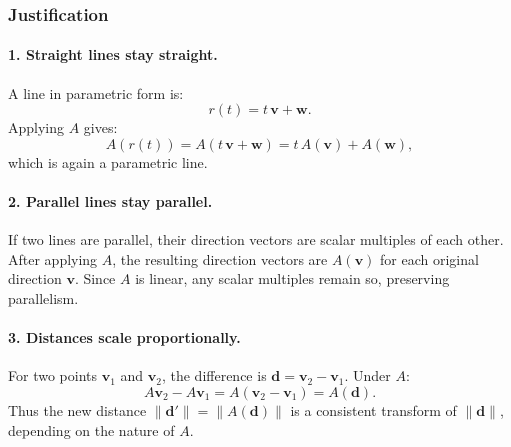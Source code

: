 \documentclass{report}
\begin{document}

\subsubsection{Justification}

\paragraph{1. Straight lines stay straight.}
A line in parametric form is:
\[
	r(t) = t\,\mathbf{v} + \mathbf{w}.
\]
Applying \(A\) gives:
\[
	A(r(t)) = A(t\,\mathbf{v} + \mathbf{w}) = t\,A(\mathbf{v}) + A(\mathbf{w}),
\]
which is again a parametric line.

\paragraph{2. Parallel lines stay parallel.}
If two lines are parallel, their direction vectors are scalar multiples of each other. After applying \(A\), the resulting direction vectors are \(A(\mathbf{v})\) for each original direction \(\mathbf{v}\). Since \(A\) is linear, any scalar multiples remain so, preserving parallelism.

\paragraph{3. Distances scale proportionally.}
For two points \(\mathbf{v}_1\) and \(\mathbf{v}_2\), the difference is \(\mathbf{d} = \mathbf{v}_2 - \mathbf{v}_1\). Under \(A\):
\[
	A\mathbf{v}_2 - A\mathbf{v}_1 = A(\mathbf{v}_2 - \mathbf{v}_1) = A(\mathbf{d}).
\]
Thus the new distance \(\|\mathbf{d}'\| = \|A(\mathbf{d})\|\) is a consistent transform of \(\|\mathbf{d}\|\), depending on the nature of \(A\).
\end{document}
